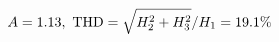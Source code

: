 \documentclass[preview]{standalone}
\begin{document}
\begin{align*}
\special{dvisvgm:raw <g id='unique000'>}A=1.13,\ \text{THD}=\sqrt{H_2^2+H_3^2}/H_1=19.1\%\special{dvisvgm:raw </g>}
\end{align*}
\end{document}
